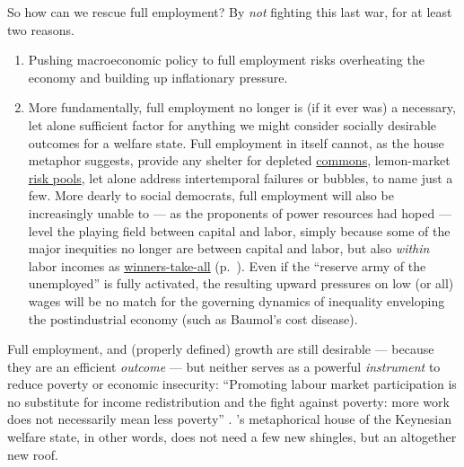 \begin{description}
	So how can we rescue full employment?
By \emph{not} fighting this last war, for at least two reasons.

	\begin{enumerate}
		\item Pushing macroeconomic policy to full employment risks overheating the economy and building up inflationary pressure.
		\item More fundamentally, full employment no longer is (if it ever was) a necessary, let alone sufficient factor for anything we might consider socially desirable outcomes for a welfare state.
Full employment in itself cannot, as the house metaphor suggests, provide any shelter for depleted \hyperref[sec:common-good]{commons}, lemon-market \hyperref[sec:adverse-selection]{risk pools}, let alone address intertemporal failures or bubbles, to name just a few.
More dearly to social democrats, full employment will also be increasingly unable to --- as the proponents of power resources had hoped --- level the playing field between capital and labor, simply because some of the major inequities no longer are between capital and labor, but also \emph{within} labor incomes as \hyperref[sec:winner-take-all]{winners-take-all} (p.~\pageref{sec:winner-take-all}).
Even if the ``reserve army of the unemployed'' is fully activated, the resulting upward pressures on low (or all) wages will be no match for the governing dynamics of inequality enveloping the postindustrial economy (such as Baumol's cost disease).
	\end{enumerate}

	Full employment, and (properly defined) growth are still desirable --- because they are an efficient \emph{outcome} --- but neither serves as a powerful \emph{instrument} to reduce poverty or economic insecurity:
``Promoting labour market participation is no substitute for income redistribution and the fight against poverty:
more work does not necessarily mean less poverty'' \citep[ix]{Esping-Andersen2002}.
\citeauthor{Offe2003}'s metaphorical house of the Keynesian welfare state, in other words, does not need a few new shingles, but an altogether new roof.


\end{description}
